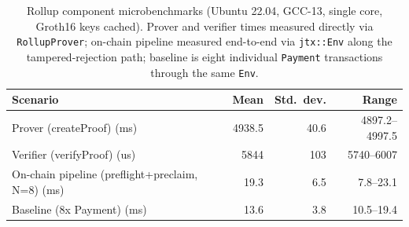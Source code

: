 \begin{table}[t]
  \centering
  \caption{Rollup component microbenchmarks (Ubuntu 22.04, GCC-13, single core, Groth16 keys cached). Prover and verifier times measured directly via \texttt{RollupProver}; on-chain pipeline measured end-to-end via \texttt{jtx::Env} along the tampered-rejection path; baseline is eight individual \texttt{Payment} transactions through the same \texttt{Env}.}
  \label{tab:rollup-benchmarks}
  \begin{tabular}{lrrr}
    \toprule
    Scenario & Mean & Std.\ dev. & Range \\
    \midrule
    Prover (createProof) (ms) & 4938.5 & 40.6 & 4897.2--4997.5 \\
    Verifier (verifyProof) (us) & 5844 & 103 & 5740--6007 \\
    On-chain pipeline (preflight+preclaim, N=8) (ms) & 19.3 & 6.5 & 7.8--23.1 \\
    Baseline (8x Payment) (ms) & 13.6 & 3.8 & 10.5--19.4 \\
    \bottomrule
  \end{tabular}
\end{table}
